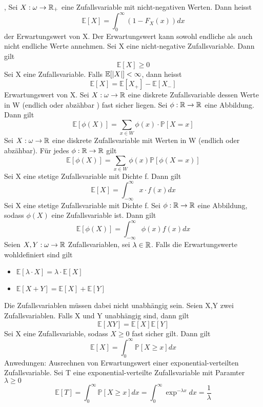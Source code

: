 \sep
\Def[4.1] \newline
Sei \( X : \omega \rightarrow \mathbb{R}_+ \) eine Zufallsvariable mit nicht-negativen Werten. Dann heisst \[ \mathbb{E}[X] = \int_0^\infty (1-F_X(x)) dx\] der Erwartungswert von X.
\Bem[4.2] \newline
Der Erwartungswert kann sowohl endliche als auch nicht endliche Werte annehmen.
\Satz[4.3] \newline
Sei X eine nicht-negative Zufallsvariable. Dann gilt \[ \mathbb{E}[X] \geq 0\]
\Def[4.4] Sei X eine Zufallsvariable. Falls \(\mathbb{E}[\left\lvert X \right\rvert] < \infty \), dann heisst \[ \mathbb{E}[X] = \mathbb{E}[X_+] - \mathbb{E}[X_-]\] Erwartungswert von X.
\Satz[4.6] Sei \( X: \omega \rightarrow \mathbb{R} \) eine diskrete Zufallsvariable dessen Werte in W (endlich oder abzähbar ) fast sicher liegen. Sei \( \phi : \mathbb{R} \rightarrow \mathbb{R} \) eine Abbildung. Dann gilt \[ \mathbb{E}[\phi(X)] = \sum_{x \in W} \phi(x) \cdot \mathbb{P}[X = x]\]
\Satz[4.7] Sei \( X: \omega \rightarrow \mathbb{R} \) eine diskrete Zufallsvariable mit Werten in W (endlich oder abzähbar). Für jedes \(\phi : \mathbb{R} \rightarrow \mathbb{R} \) gilt \[ \mathbb{E}[\phi(X)] = \sum_{x \in W} \phi(x) \mathbb{P}[\phi(X = x)]\]
\Satz[4.8] Sei X eine stetige Zufallsvariable mit Dichte f. Dann gilt \[\mathbb{E}[X] = \int_{-\infty}^{\infty} x \cdot f(x)dx\]
\Theo[4.9] Sei X eine stetige Zufallsvariable mit Dichte f. Sei \(\phi : \mathbb{R} \rightarrow \mathbb{R} \) eine Abbildung, sodass \( \phi(X )\) eine Zufallsvariable ist. Dann gilt \[ \mathbb{E}[\phi(X)] = \int_{-\infty}^{\infty} \phi(x)f(x)dx\]
 \newline
Seien \(X, Y : \omega \rightarrow \mathbb{R} \) Zufallsvariablen, sei \(\lambda \in \mathbb{R}\). Falls die Erwartungswerte wohldefiniert sind gilt \begin{itemize}
    \item \(\mathbb{E}[ \lambda \cdot X ] = \lambda \cdot \mathbb{E}[X]\)
    \item \(\mathbb{E}[X + Y] = \mathbb{E}[X] + \mathbb{E}[Y]\)
\end{itemize}
\Bem[4.11] Die Zufallsvariablen müssen dabei nicht unabhängig sein.
\Theo[4.13] Seien X,Y zwei Zufallsvariablen. Falls X und Y unabhängig sind, dann gilt \[ \mathbb{E}[XY] = \mathbb{E}[X]\mathbb{E}[Y]\]
 \newline
Sei X eine Zufallsvariable, sodass \( X \geq 0 \) fast sicher gilt. Dann gilt \[ \mathbb{E}[X] = \int_0^{\infty} \mathbb{P}[X \geq x]dx\]
\Bem[4.14A]
Anwedungen: Ausrechnen von Erwartungswert einer exponential-verteilten Zufallsvariable. Sei T eine exponential-verteilte Zufallsvariable mit Paramter \(\lambda \geq 0\) \[ \mathbb{E}[T] = \int_0^\infty \mathbb{P}[X \geq x]dx = \int_0^\infty \exp^{-\lambda x }dx = \frac{1}{\lambda}\]
